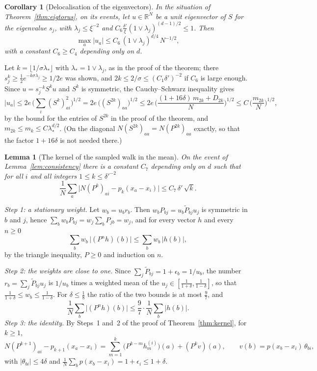 \documentclass[11pt,a4paper]{article}
\makeatletter
\theoremstyle{stmt}
\newtheorem{lemma}[theorem]{Lemma}
\newtheorem{corollary}[theorem]{Corollary}
\theoremstyle{defn}
\theoremstyle{rmk}
\renewenvironment{proof}[1][\proofname]{\par\pushQED{\qed}\normalfont\topsep6\p@\@plus6\p@\relax
  \trivlist\item[\hskip\labelsep{\sffamily\itshape\small #1.}]\ignorespaces}{\popQED\endtrivlist\@endpefalse}
\numberwithin{equation}{section}
\newcommand{\R}{\mathbb{R}}
\makeatother
\begin{document}
{\begin{corollary}[Delocalisation of the eigenvectors]\label{cor:deloc}
In the situation of Theorem~\ref{thm:eigtorus}, on its events, let $u\in\R^N$ be a unit eigenvector of $S$ for the eigenvalue $s_j$, with $\lambda_j\le\xi^{-2}$ and $C_6\frac{\delta'}\xi(1\vee\lambda_j)^{(d-1)/2}\le1$. Then
\[
\max_a|u_a|\le C_6\,(1\vee\lambda_j)^{d/4}\,N^{-1/2},
\]
with a constant $C_6\ge C_4$ depending only on $d$.
\end{corollary}

\begin{proof}
Let $k=\lfloor1/\sigma\lambda_*\rfloor$ with $\lambda_*=1\vee\lambda_j$, as in the proof of the theorem; there $s_j^k\ge\frac12e^{-k\sigma\lambda_j}\ge1/2e$ was shown, and $2k\le2/\sigma\le(C_1\delta')^{-2}$ if $C_6$ is large enough. Since $u=s_j^{-k}S^ku$ and $S^k$ is symmetric, the Cauchy--Schwarz inequality gives
\[
|u_a|\le2e\,\Big(\sum_i(S^k)_{ai}^2\Big)^{1/2}=2e\,\big((S^{2k})_{aa}\big)^{1/2}\le2e\,\Big(\frac{(1+16\delta)\,m_{2k}+D_{2k}}N\Big)^{1/2}\le C\,\Big(\frac{m_{2k}}N\Big)^{1/2},
\]
by the bound for the entries of $S^{2k}$ in the proof of the theorem, and $m_{2k}\le m_k\le C\lambda_*^{d/2}$. (On the diagonal $N(S^{2k})_{aa}=N(P^{2k})_{aa}$ exactly, so that the factor $1+16\delta$ is not needed there.)
\end{proof}

\begin{lemma}[The kernel of the sampled walk in the mean]\label{lem:kernel-l1}
On the event of Lemma~\ref{lem:consistency} there is a constant $C_7$ depending only on $d$ such that for
all $i$ and all integers $1\le k\le\delta'^{-2}$
\[
 \frac1N\sum_a\big|N(P^k)_{ai}-p_k(x_a-x_i)\big|\le C_7\,\delta'\,\sqrt k .
\]
\end{lemma}

\begin{proof}
\emph{Step 1: a stationary weight.} Let $w_b=u_br_b$. Then $w_bP_{bj}=u_b\tilde P_{bj}u_j$ is symmetric in
$b$ and $j$, hence $\sum_bw_bP_{bj}=w_j\sum_bP_{jb}=w_j$, and for every vector $h$ and every $n\ge0$
\[
 \sum_bw_b\,\big|(P^nh)(b)\big|\le\sum_bw_b\,|h(b)| ,
\]
by the triangle inequality, $P\ge0$ and induction on $n$.

\emph{Step 2: the weights are close to one.} Since $\sum_j\tilde P_{bj}=1+\epsilon_b=1/u_b$, the number
$r_b=\sum_j\tilde P_{bj}u_j$ is $1/u_b$ times a weighted mean of the $u_j\in[\frac1{1+\delta},\frac1{1-\delta}]$, so
that $\frac1{1+\delta}\le w_b\le\frac1{1-\delta}$. For $\delta\le\frac18$ the ratio of the two bounds is at
most $\frac97$, and
\[
 \frac1N\sum_b\big|(P^nh)(b)\big|\le\frac97\cdot\frac1N\sum_b|h(b)| .
\]
\emph{Step 3: the identity.} By Steps~1 and~2 of the proof of Theorem~\ref{thm:kernel}, for $k\ge1$,
\[
 N(P^{k+1})_{ai}-p_{k+1}(x_a-x_i)=\sum_{m=1}^k\big(P^{k-m}h^{(i)}_m\big)(a)+(P^kv)(a),\qquad
 v(b)=p(x_b-x_i)\,\theta_{bi},
\]
with $|\theta_{bi}|\le4\delta$ and $\frac1N\sum_bp(x_b-x_i)=1+\epsilon_i\le1+\delta$.


\end{proof}}
\end{document}
